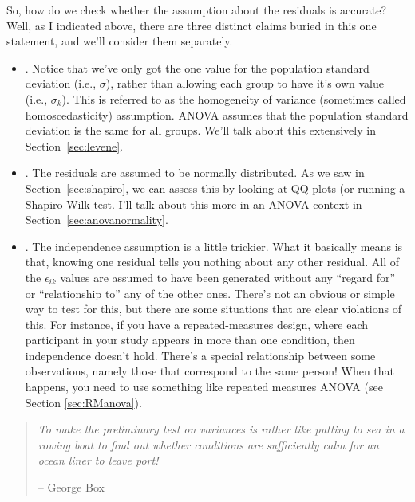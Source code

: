 So, how do we check whether the assumption about the residuals is accurate? Well, as I indicated above, there are three distinct claims buried in this one statement, and we'll consider them separately.
\begin{itemize}
\item {}. Notice that we've only got the one value for the population standard deviation (i.e., $\sigma$), rather than allowing each group to have it's own value (i.e., $\sigma_k$). This is referred to as the homogeneity of variance (sometimes called homoscedasticity) assumption. ANOVA assumes that the population standard deviation is the same for all groups. We'll talk about this extensively in Section~\ref{sec:levene}. 
\item {}. The residuals are assumed to be normally distributed. As we saw in Section~\ref{sec:shapiro}, we can assess this by looking at QQ plots (or running a Shapiro-Wilk test. I'll talk about this more in an ANOVA context in Section~\ref{sec:anovanormality}. 
\item {}. The independence assumption is a little trickier. What it basically means is that, knowing one residual tells you nothing about any other residual. All of the $\epsilon_{ik}$ values are assumed to have been generated without any ``regard for'' or ``relationship to'' any of the other ones. There's not an obvious or simple way to test for this, but there are some situations that are clear violations of this. For instance, if you have a repeated-measures design, where each participant in your study appears in more than one condition, then independence doesn't hold. There's a special relationship between some observations, namely those that correspond to the same person! When that happens, you need to use something like repeated measures ANOVA (see Section \ref{sec:RManova}). 
\end{itemize}



\begin{quote}
{\it To make the preliminary test on variances is rather like putting to sea in a rowing boat to find out whether conditions are sufficiently calm for an ocean liner to leave port!} 

\hspace*{2cm} -- George Box \parencite{Box1953}
\end{quote}


